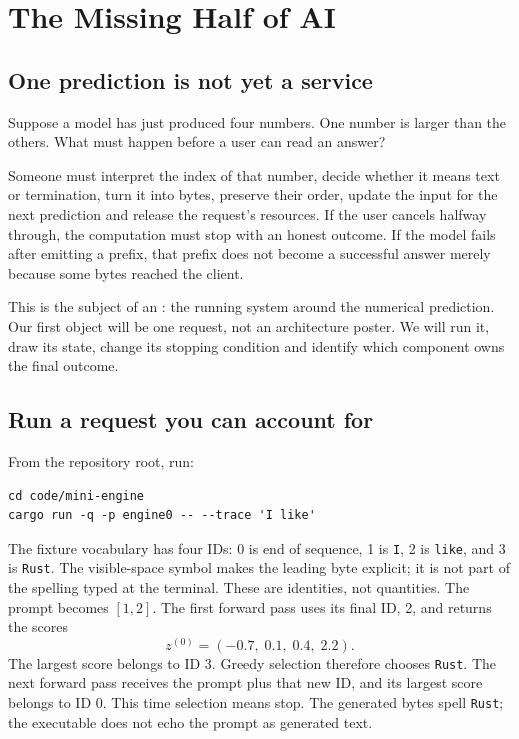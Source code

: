 \chapter{The Missing Half of AI}\label{chapter-1-the-missing-half-of-ai}

\section{One prediction is not yet a service}
Suppose a model has just produced four numbers. One number is larger than the
others. What must happen before a user can read an answer?

Someone must interpret the index of that number, decide whether it means text
or termination, turn it into bytes, preserve their order, update the input for
the next prediction and release the request's resources. If the user cancels
halfway through, the computation must stop with an honest outcome. If the model
fails after emitting a prefix, that prefix does not become a successful answer
merely because some bytes reached the client.

This is the subject of an : the running system around
the numerical prediction. Our first object will be one request, not an
architecture poster. We will run it, draw its state, change its stopping
condition and identify which component owns the final outcome.


\section{Run a request you can account for}
From the repository root, run:
\begin{verbatim}
cd code/mini-engine
cargo run -q -p engine0 -- --trace 'I like'
\end{verbatim}
The fixture vocabulary has four IDs: 0 is end of sequence, 1 is \texttt{I},
2 is \texttt{\textvisiblespace like}, and 3 is
\texttt{\textvisiblespace Rust}. The visible-space symbol makes the leading
byte explicit; it is not part of the spelling typed at the terminal.
These are identities, not quantities. The prompt becomes $[1,2]$.
The first forward pass uses its final ID, 2, and returns the scores
\begin{equation}
z^{(0)}=(-0.7,\;0.1,\;0.4,\;2.2).
\label{eq:first-logits}
\end{equation}
The largest score belongs to ID 3. Greedy selection therefore chooses
\texttt{Rust}. The next forward pass receives the prompt plus that new ID,
and its largest score belongs to ID 0. This time selection means stop.
The generated bytes spell \texttt{\textvisiblespace Rust}; the executable does not echo the
prompt as generated text.

